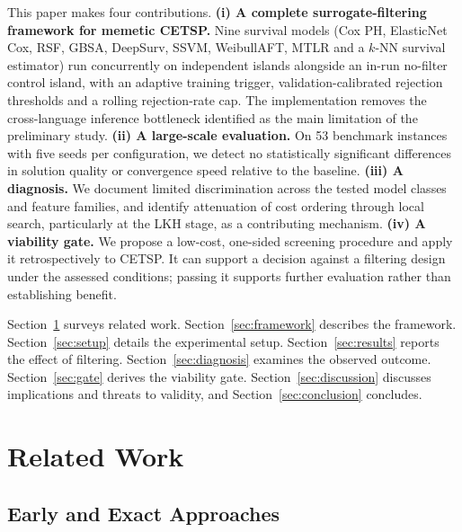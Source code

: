 \documentclass[a4paper,fleqn]{cas-dc}
\begin{document}
This paper makes four contributions.
\textbf{(i) A complete surrogate-filtering framework for memetic CETSP.}
Nine survival models (Cox PH, ElasticNet Cox, RSF, GBSA, DeepSurv, SSVM,
WeibullAFT, MTLR and a $k$-NN survival estimator) run concurrently on
independent islands alongside an in-run no-filter control island, with an
adaptive training trigger, validation-calibrated rejection thresholds and a
rolling rejection-rate cap. The implementation removes the cross-language
inference bottleneck identified as the main limitation of the preliminary study.
\textbf{(ii) A large-scale evaluation.} On 53 benchmark instances with five
seeds per configuration, we detect no statistically significant differences in
solution quality or convergence speed relative to the baseline.
\textbf{(iii) A diagnosis.} We document limited discrimination across the tested
model classes and feature families, and identify attenuation of cost ordering
through local search, particularly at the LKH stage, as a contributing mechanism.
\textbf{(iv) A viability gate.} We propose a low-cost, one-sided screening
procedure and apply it retrospectively to CETSP. It can support a decision
against a filtering design under the assessed conditions; passing it supports
further evaluation rather than establishing benefit.

Section~\ref{sec:related} surveys related work. Section~\ref{sec:framework}
describes the framework. Section~\ref{sec:setup} details the experimental setup.
Section~\ref{sec:results} reports the effect of filtering.
Section~\ref{sec:diagnosis} examines the observed outcome. Section~\ref{sec:gate}
derives the viability gate. Section~\ref{sec:discussion} discusses implications
and threats to validity, and Section~\ref{sec:conclusion} concludes.

\section{Related Work}\label{sec:related}

\subsection{Early and Exact Approaches}\label{sec:rel-exact}
\end{document}
